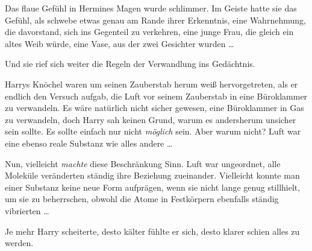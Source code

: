 Das flaue Gefühl in Hermines Magen wurde schlimmer. Im Geiste hatte sie das Gefühl, als schwebe etwas genau am Rande ihrer Erkenntnis, eine Wahrnehmung, die davorstand, sich ins Gegenteil zu verkehren, eine junge Frau, die gleich ein altes Weib würde, eine Vase, aus der zwei Gesichter wurden …

Und sie rief sich weiter die Regeln der Verwandlung ins Gedächtnis.

\later

Harrys Knöchel waren um seinen Zauberstab herum weiß hervorgetreten, als er endlich den Versuch aufgab, die Luft vor seinem Zauberstab in eine Büroklammer zu verwandeln. Es wäre natürlich nicht sicher gewesen, eine Büroklammer in Gas zu verwandeln, doch Harry sah keinen Grund, warum es andersherum unsicher sein sollte. Es sollte einfach nur nicht \emph{möglich} sein. Aber warum nicht? Luft war eine ebenso reale Substanz wie alles andere …

Nun, vielleicht \emph{machte} diese Beschränkung Sinn. Luft war ungeordnet, alle Moleküle veränderten ständig ihre Beziehung zueinander. Vielleicht konnte man einer Substanz keine neue Form aufprägen, wenn sie nicht lange genug stillhielt, um sie zu beherrschen, obwohl die Atome in Festkörpern ebenfalls ständig vibrierten …

Je mehr Harry scheiterte, desto kälter fühlte er sich, desto klarer schien alles zu werden.

